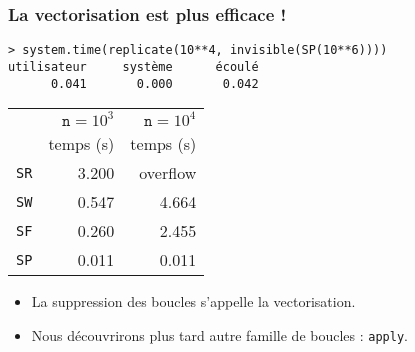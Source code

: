 \documentclass[10pt]{beamer}
\begin{document}
\begin{frame}[fragile]
  \frametitle{La vectorisation est plus efficace !}

\begin{lstlisting}
> system.time(replicate(10**4, invisible(SP(10**6))))
utilisateur     système      écoulé 
      0.041       0.000       0.042 
\end{lstlisting}


\begin{table}[h]
  \centering
  \begin{tabular}{lrr}
    \toprule
                & $\mathtt{n}=10^3$ & $\mathtt{n}=10^4$ \\
                & temps (s)         & temps (s)         \\
    \midrule
    \texttt{SR} & 3.200             & overflow          \\
    \texttt{SW} & 0.547             & 4.664             \\
    \texttt{SF} & 0.260             & 2.455             \\
    \texttt{SP} & 0.011             & 0.011             \\
    \bottomrule
  \end{tabular}
\end{table}

\begin{itemize}
\item<alert@1> La suppression des boucles s’appelle la vectorisation.
\item Nous découvrirons plus tard autre famille de boucles : \texttt{apply}.
\end{itemize}

\end{frame}





 \questionSlide

 \appendix
 \backupSlides







\end{document}
